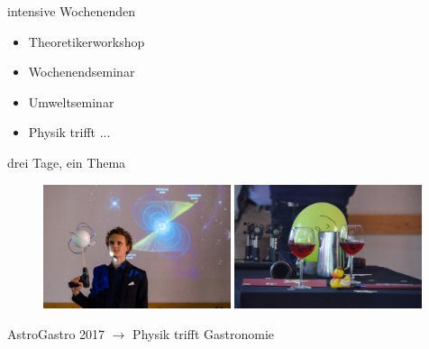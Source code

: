 \documentclass[
]{beamer}
\begin{document}
\begin{frame}{intensive Wochenenden}
  \begin{minipage}{0.4\textwidth}
    \begin{itemize}
      \item Theoretikerworkshop
      \item Wochenendseminar
      \item Umweltseminar
      \item Physik trifft ...
    \end{itemize}
    \begin{center}
      drei Tage, ein Thema
    \end{center}
  \end{minipage}%
  \hfill
  \begin{minipage}{0.58\textwidth}
    \begin{figure}
      \centering
      \includegraphics[width=0.49\textwidth]{figure/astrogastro_2017_david}\hfill
      \includegraphics[width=0.49\textwidth]{figure/astrogastro_2017_wein}
     \end{figure}
     \begin{center}
      \small{AstroGastro 2017 $\rightarrow$ Physik trifft Gastronomie}
    \end{center}
  \end{minipage}

  \vspace*{0.7cm}
  

\end{frame}
\end{document}
